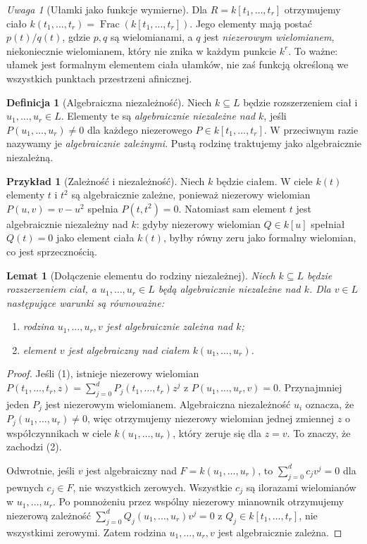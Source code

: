 \documentclass[11pt,a4paper,openany]{report}
\numberwithin{equation}{section}
\theoremstyle{plain}
\newtheorem{lemat}[twierdzenie]{Lemat}
\theoremstyle{definition}
\newtheorem{definicja}[twierdzenie]{Definicja}
\newtheorem{przyklad}[twierdzenie]{Przykład}
\theoremstyle{remark}
\newtheorem{uwaga}[twierdzenie]{Uwaga}
\newcommand{\Frac}{\operatorname{Frac}}
\begin{document}
\begin{uwaga}[Ułamki jako funkcje wymierne]
Dla $R=k[t_1,\dots,t_r]$ otrzymujemy ciało
$k(t_1,\dots,t_r)=\Frac(k[t_1,\dots,t_r])$.
Jego elementy mają postać $p(t)/q(t)$, gdzie $p,q$ są
wielomianami, a $q$ jest \emph{niezerowym wielomianem},
niekoniecznie wielomianem, który nie znika w każdym punkcie $k^r$.
To ważne: ułamek jest formalnym elementem ciała ułamków,
nie zaś funkcją określoną we wszystkich punktach przestrzeni afinicznej.
\end{uwaga}

\begin{definicja}[Algebraiczna niezależność]
Niech $k\subseteq L$ będzie rozszerzeniem ciał i
$u_1,\dots,u_r\in L$. Elementy te są
\emph{algebraicznie niezależne nad $k$}, jeśli
$P(u_1,\dots,u_r)\ne0$ dla każdego niezerowego
$P\in k[t_1,\dots,t_r]$. W przeciwnym razie
nazywamy je \emph{algebraicznie zależnymi}.
Pustą rodzinę traktujemy jako algebraicznie niezależną.
\end{definicja}

\begin{przyklad}[Zależność i niezależność]
Niech $k$ będzie ciałem. W ciele $k(t)$ elementy $t$ i $t^2$ są algebraicznie zależne,
ponieważ niezerowy wielomian $P(u,v)=v-u^2$ spełnia
$P(t,t^2)=0$. Natomiast sam element $t$ jest algebraicznie
niezależny nad $k$: gdyby niezerowy wielomian $Q\in k[u]$
spełniał $Q(t)=0$ jako element ciała $k(t)$,
byłby równy zeru jako formalny wielomian, co jest sprzecznością.
\end{przyklad}

\begin{lemat}[Dołączenie elementu do rodziny niezależnej]
\label{lem:independence-algebraic}
Niech $k\subseteq L$ będzie rozszerzeniem ciał,
a $u_1,\dots,u_r\in L$ będą algebraicznie niezależne nad $k$.
Dla $v\in L$ następujące warunki są równoważne:
\begin{enumerate}[label=\arabic*)]
\item rodzina $u_1,\dots,u_r,v$ jest algebraicznie zależna nad $k$;
\item element $v$ jest algebraiczny nad ciałem $k(u_1,\dots,u_r)$.
\end{enumerate}
\end{lemat}
\begin{proof}
Jeśli (1), istnieje niezerowy wielomian
$P(t_1,\dots,t_r,z)=\sum_{j=0}^d P_j(t_1,\dots,t_r)z^j$
z $P(u_1,\dots,u_r,v)=0$.
Przynajmniej jeden $P_j$ jest niezerowym wielomianem.
Algebraiczna niezależność $u_i$ oznacza, że
$P_j(u_1,\dots,u_r)\ne0$, więc otrzymujemy
niezerowy wielomian jednej zmiennej $z$ o współczynnikach
w ciele $k(u_1,\dots,u_r)$, który zeruje się dla $z=v$.
To znaczy, że zachodzi (2).

Odwrotnie, jeśli $v$ jest algebraiczny nad
$F=k(u_1,\dots,u_r)$, to
$\sum_{j=0}^d c_j v^j=0$ dla pewnych $c_j\in F$,
nie wszystkich zerowych. Wszystkie $c_j$ są ilorazami
wielomianów w $u_1,\dots,u_r$. Po pomnożeniu przez wspólny
niezerowy mianownik otrzymujemy niezerową zależność
$\sum_{j=0}^d Q_j(u_1,\dots,u_r)v^j=0$
z $Q_j\in k[t_1,\dots,t_r]$, nie wszystkimi zerowymi.
Zatem rodzina $u_1,\dots,u_r,v$ jest algebraicznie zależna.
\end{proof}
\end{document}
